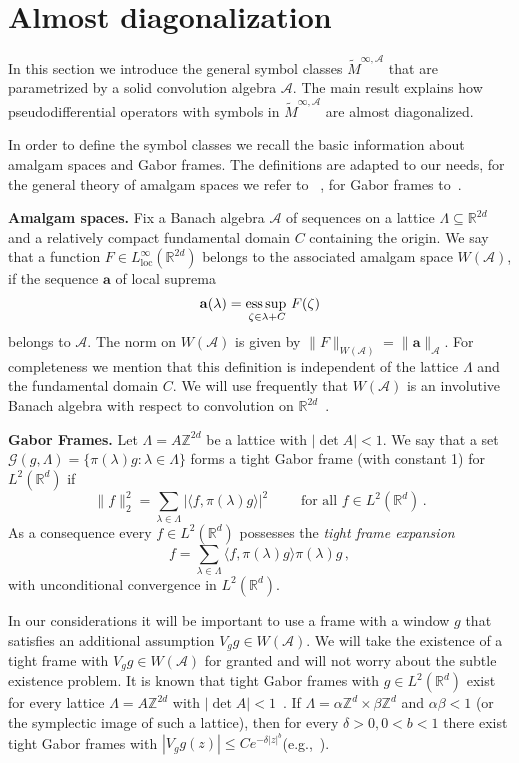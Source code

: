 \documentclass[12pt]{amsart}
\theoremstyle{definition}
\theoremstyle{remark}
\numberwithin{equation}{section}
\newcommand{\psdo}{pseudodifferential operator}
\newcommand{\symbo}{\widetilde M^{\infty, \cA}}
\def\cA{\mathcal{A}}
\def\bR{{\mathbb{R}}}
\def\bZ{{\mathbb{Z}}}
\def\rd{\bR^d}
\def\rdd{{\bR^{2d}}}
\def\zdd{{\bZ^{2d}}}
\def\lrd{L^2(\rd)}
\def\zd{\bZ^d}
\def\cA{\mathcal{A}}
\newcommand{\bba}{{\bf a}}
\newcommand{\Cal}{\mathcal}
\newcommand{\la}{\lambda}
\newcommand{\La}{\Lambda}
\newcommand{\lan}{\langle}
\newcommand{\ran}{\rangle}
\newcommand{\ac}{\Cal A}
\DeclareMathOperator*{\esup}{ess\,sup\,}
\begin{document}
\section{Almost diagonalization}

In this section we introduce the general symbol classes $\symbo $ that
are parametrized by a solid convolution algebra $\cA $. The main
result explains how \psdo s  with symbols in $\symbo $ are almost
diagonalized. %

In order to define the symbol classes we recall
the basic information about amalgam spaces and Gabor frames. The
definitions are adapted to our needs, for the general theory of
amalgam spaces we refer to ~\cite{fournier-stewart85,feichtinger90}, for Gabor frames
to~\cite{book,chr03}. 

\textbf{Amalgam spaces.}  Fix  a  Banach algebra $\ac$ of
sequences on a lattice $\Lambda\subseteq \rdd  $ and a  relatively compact
fundamental domain $C$ containing the origin. We     say that a
function $F\in L^\infty_{\text {loc}}(\rdd)$ belongs to  the associated
amalgam space $W(\ac)$, 
if the sequence $\mathbf{a}$ of local suprema
\[
\bba(\la)=\esup _{\zeta\in\la+C} F(\zeta)
\]
belongs to $\ac$.  The norm on $W(\ac)$ is given by
$\|F\|_{W(\ac)}=\|\mathbf{a}\|_\ac$. For completeness we mention that
this definition is independent of the lattice $\Lambda $ and the fundamental
domain $C$. We will use frequently that   $W(\cA )$ is an involutive 
Banach algebra with respect to convolution on $\rdd
$~\cite{feichtinger83}.  

\textbf{Gabor Frames.} Let $\La=A\zdd$ be a lattice with $|\det
A|<1$. We say that a set $\Cal
G(g,\La)=\{\pi(\la)g:\la\in\La\}$ forms a tight Gabor frame (with constant 1) for
$\lrd$ if 
\begin{equation}
  \label{eq:ll2}
  \|f\|_2^2 = \sum _{\lambda \in \Lambda } |\langle f, \pi (\lambda
  ) g\rangle |^2 \qquad  \text{ for all } f\in\lrd \, .
\end{equation}
As a consequence every $f\in \lrd $ possesses the  {\it tight
frame expansion}
\[
f=\sum_{\la\in\La}\lan f,\pi(\la)g\ran\pi(\la)g\, ,
\]
with unconditional convergence in $\lrd $. 


In our considerations it will be important to use  a frame
with a window $g$ that satisfies an additional assumption $V_gg \in
W(\ac)$. We will take the existence of a tight frame with $V_gg \in W(\ac
)$ for granted and will not worry about the subtle existence problem. It is
known that  tight Gabor frames with $g\in \lrd $ exist  for every
lattice $\Lambda = A\zdd $ with $|\det A| <1$~\cite{bekka04}.   
If $\Lambda = \alpha \zd \times \beta \zd $ and $\alpha \beta <1$ (or
the symplectic image of such a lattice), then for every $\delta>0, 0<b<1$
there exist tight Gabor 
frames with $|V_gg (z) | \leq  Ce^{-\delta|z|^b}$(e.g.,~\cite{GL04}). 
\end{document}
